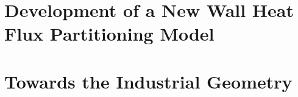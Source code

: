 





\cleardoublepage %

\part{Development of a New Wall Heat Flux Partitioning Model}








  




\cleardoublepage %

\part{Towards the Industrial Geometry}










\cleardoublepage %





%


